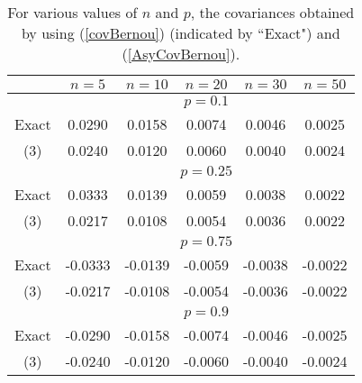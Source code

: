 \documentclass[12pt]{article}
\begin{document}
\begin{table}[htbp]
\begin{center}
\caption{For various values of $n$ and $p$, the covariances obtained by using (\ref{covBernou}) (indicated by ``Exact") and (\ref{AsyCovBernou}).}
\begin{tabular}{c|ccccc}
\hline
\hline
    & $n=5$ & $n=10$ & $n=20$ & $n=30$ & $n=50$\\
    \hline
    & \multicolumn{5}{|c}{$p=0.1$}\\
Exact & 0.0290& 0.0158& 0.0074& 0.0046& 0.0025\\
(3)   & 0.0240& 0.0120& 0.0060& 0.0040& 0.0024\\
\hline
    & \multicolumn{5}{|c}{$p=0.25$}\\
Exact & 0.0333& 0.0139& 0.0059& 0.0038& 0.0022\\
(3)   & 0.0217& 0.0108& 0.0054& 0.0036& 0.0022\\
\hline
    & \multicolumn{5}{|c}{$p=0.75$}\\
Exact & -0.0333& -0.0139& -0.0059& -0.0038& -0.0022\\
(3)   & -0.0217& -0.0108& -0.0054& -0.0036& -0.0022\\
\hline
    & \multicolumn{5}{|c}{$p=0.9$}\\
Exact & -0.0290& -0.0158& -0.0074& -0.0046& -0.0025\\
(3)   & -0.0240& -0.0120& -0.0060& -0.0040& -0.0024\\
\hline
\end{tabular}
\end{center}
\end{table}
\end{document}
